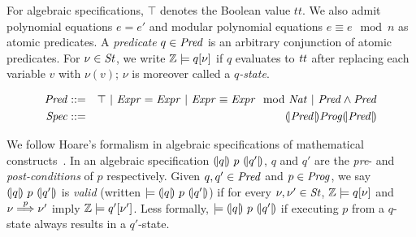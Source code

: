 For algebraic specifications, $\top$ denotes the Boolean value
$\mathit{tt}$. We also admit polynomial equations $e = e'$ and modular
polynomial equations $e \equiv e \mod n$ as atomic predicates.
A \emph{predicate} $q \in \mathit{Pred}$ is an arbitrary conjunction of atomic
predicates. For 
$\nu \in \mathit{St}$, we write $\mathbb{Z} \models q[\nu]$ if $q$
evaluates to $\mathit{tt}$ after replacing each variable $v$ with
$\nu(v)$; $\nu$ is moreover called a \emph{$q$-state}.

\begin{eqnarray*}
  \mathit{Pred} & ::= & \top
     \ |\   \mathit{Expr} = \mathit{Expr}
     \ |\   \mathit{Expr} \equiv \mathit{Expr} \mod {\mathit{Nat}}
     \ |\   \mathit{Pred} \wedge \mathit{Pred}\\
  \mathit{Spec} & ::= & {(\!|}{\mathit{Pred}}{|\!)} \mathit{Prog} {(\!|}{\mathit{Pred}}{|\!)}
\end{eqnarray*}

We follow Hoare's formalism in algebraic specifications of
mathematical constructs~\cite{H:69:ABCP}. In an algebraic
specification ${(\!|}{q}{|\!)}~{p}~{(\!|}{q'}{|\!)}$, $q$ and $q'$ are the \emph{pre}- and
\emph{post-conditions} of $p$ respectively. Given $q, q' \in \mathit{Pred}$ and $p
\in \mathit{Prog}$, we say ${(\!|}{q}{|\!)}~{p}~{(\!|}{q'}{|\!)}$ is \emph{valid}
(written $\models {(\!|}{q}{|\!)}~{p}~{(\!|}{q'}{|\!)}$) if for every $\nu, \nu' \in
\mathit{St}$, $\mathbb{Z} \models q[\nu]$ and $\nu \overset{p}{\Longrightarrow} \nu'$ imply
$\mathbb{Z} \models q'[\nu']$. Less formally, $\models
{(\!|}{q}{|\!)}~{p}~{(\!|}{q'}{|\!)}$ if executing $p$ from a $q$-state always
results in a $q'$-state. 


